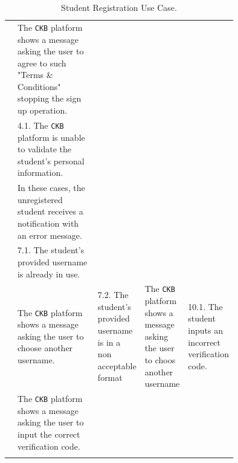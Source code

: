 \begin{center}
\begin{longtable}{lp{0.75\linewidth}}
            & The \verb|CKB| platform shows a message asking the user to agree to such "Terms \& Conditions" stopping the sign up operation.                                                                                                     \\
        & 4.1. The \verb|CKB| platform is unable to validate the student's personal information.                                                                                                           \\
            & In these cases, the unregistered student receives a notification with an error message.   \\
        & 7.1. The student's provided username is already in use.                                                                                                           \\
            & The \verb|CKB| platform shows a message asking the user to choose another username.   
        & 7.2. The student's provided username is in a non acceptable format    
            & The \verb|CKB| platform shows a message asking the user to choos another username    
        & 10.1. The student inputs an incorrect verification code.                                                                                                           \\
            & The \verb|CKB| platform shows a message asking the user to input the correct verification code.      
                                                                                        \\    
        \hline
        \caption{Student Registration Use Case.}
        \label{tab: student_registration_use_case}
    \end{longtable}

\end{center}



